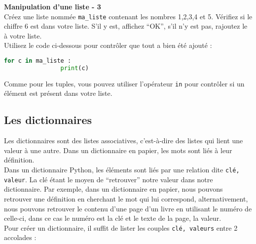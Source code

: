     \begin{Exercice}[5 minutes] \textbf{Manipulation d'une liste - 3}\\
       Créez une liste nommée \lstinline{ma_liste} contenant les nombres 1,2,3,4 et 5. Vérifiez si le chiffre 6 est dans votre liste. S'il y est, affichez ``OK'', s'il n'y est pas, rajoutez le à votre liste. \\
       
       Utilisez le code ci-dessous pour contrôler que tout a bien été ajouté : \\
       
       \begin{lstlisting}[language=Python]
            for c in ma_liste :
            	print(c)   \end{lstlisting}
    
        \begin{conseil}
            Comme pour les tuples, vous pouvez utiliser l'opérateur \lstinline{in} pour contrôler si un élément est présent dans votre liste.
        \end{conseil}
        
        \begin{solution}
             
        \end{solution}
    \end{Exercice}

	\subsection{Les dictionnaires}
	Les dictionnaires sont des listes associatives, c’est-à-dire des listes qui lient une valeur à une autre. Dans un dictionnaire en papier, les mots sont liés à leur définition. \\
	
	Dans un dictionnaire Python, les éléments sont liés par une relation dite \lstinline{clé, valeur}. La clé étant le moyen de “retrouver” notre valeur dans notre dictionnaire. Par exemple, dans un dictionnaire en papier, nous pouvons retrouver une définition en cherchant le mot qui lui correspond, alternativement, nous pouvons retrouver le contenu d’une page d’un livre en utilisant le numéro de celle-ci, dans ce cas le numéro est la clé et le texte de la page, la valeur. \\
	
	Pour créer un dictionnaire, il suffit de lister les couples \lstinline{clé, valeurs} entre 2 accolades : \\
	
